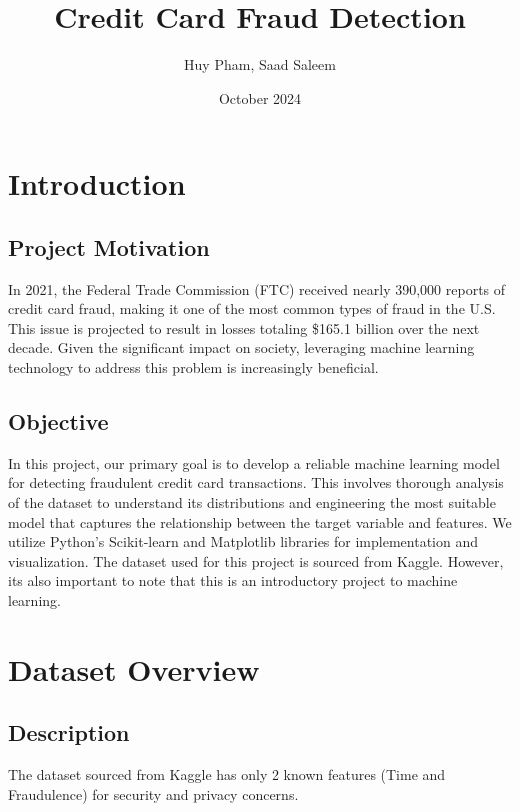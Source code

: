 \documentclass[12pt, letterpaper]{article}
\title{Credit Card Fraud Detection}
\author{Huy Pham, Saad Saleem}
\date{October 2024}
\begin{document}
\maketitle

\section{Introduction}
    \subsection{Project Motivation}
        In 2021, the Federal Trade Commission (FTC) received nearly 390,000 reports of credit card fraud, making it one of the most common types of fraud in the U.S. This issue is projected to result in losses totaling \$165.1 billion over the next decade. Given the significant impact on society, leveraging machine learning technology to address this problem is increasingly beneficial.

    \subsection{Objective}
        In this project, our primary goal is to develop a reliable machine learning model for detecting fraudulent credit card transactions. This involves thorough analysis of the dataset to understand its distributions and engineering the most suitable model that captures the relationship between the target variable and features. We utilize Python's Scikit-learn and Matplotlib libraries for implementation and visualization. The dataset used for this project is sourced from Kaggle. However, its also important to note that this is an introductory project to machine learning.
    
 
\section{Dataset Overview}
    \subsection{Description}
        The dataset sourced from Kaggle has only 2 known features (Time and Fraudulence) for security and privacy concerns. 
\end{document}
